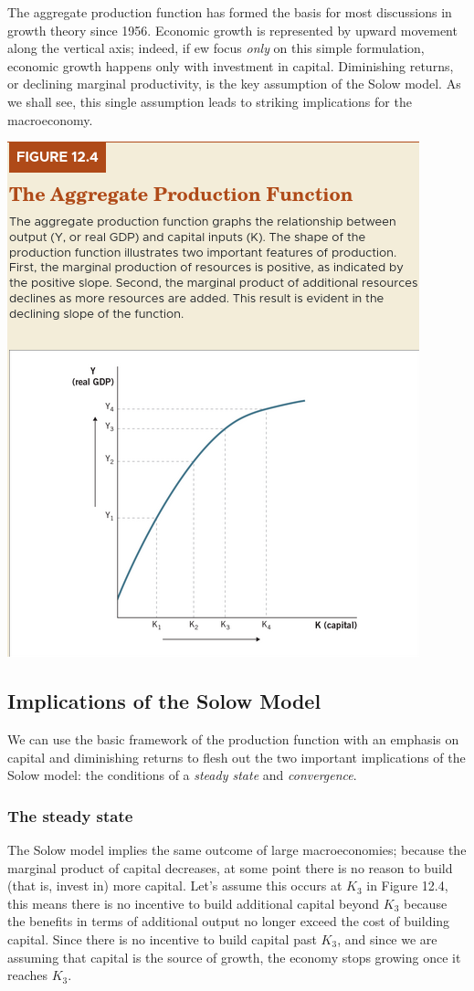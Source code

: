 \documentclass[11pt]{article} %
\begin{document}
The aggregate production function has formed the basis for most discussions in growth theory since 1956. Economic growth is represented by upward movement along the vertical axis; indeed, if ew focus \textit{only} on this simple formulation, economic growth happens only with investment in capital. Diminishing returns, or declining marginal productivity, is the key assumption of the Solow model. As we shall see, this single assumption leads to striking implications for the macroeconomy.
\begin{center}
\includegraphics[scale=0.5]{Images/Figure 12.4.png} \end{center}

\subsection*{Implications of the Solow Model}
We can use the basic framework of the production function with an emphasis on capital and diminishing returns to flesh out the two important implications of the Solow model: the conditions of a \textit{steady state} and \textit{convergence}.

\subsubsection*{The steady state}
The Solow model implies the same outcome of large macroeconomies; because the marginal product of capital decreases, at some point there is no reason to build (that is, invest in) more capital. Let's assume this occurs at \(K_3\) in Figure 12.4, this means there is no incentive to build additional capital beyond \(K_3\) because the benefits in terms of additional output no longer exceed the cost of building capital. Since there is no incentive to build capital past \(K_3\), and since we are assuming that capital is the source of growth, the economy stops growing once it reaches \(K_3\).
\end{document}
